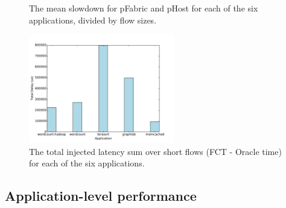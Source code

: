 %
\begin{figure}
  \centering
  \caption{\small{The mean slowdown for pFabric and pHost for each of the six applications, divided by flow sizes.}}
  \label{fig:phostp}
\end{figure}
%
\begin{figure}
  \centering
    \includegraphics[width = 2.5in]{img/fig14_delayinjected} 
  \caption{\small{The total injected latency sum over short flows (FCT - Oracle time) for each of the six applications.}}
  \label{fig:delayinj}
\end{figure}

\subsection{Application-level performance}

